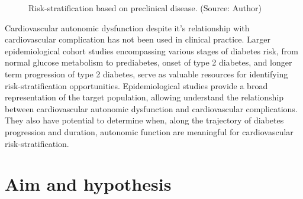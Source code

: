\documentclass[
  a4paper,
  headsepline=true,
  open=any]{scrbook}
\begin{document}
\begin{figure}

\begin{minipage}[t]{\linewidth}

{\centering 


\caption{Risk-stratification based on preclinical disease. (Source:
Author)}

}

\end{minipage}%

\end{figure}

Cardiovascular autonomic dysfunction despite it's relationship with
cardiovascular complication has not been used in clinical practice.
Larger epidemiological cohort studies encompassing various stages of
diabetes risk, from normal glucose metabolism to prediabetes, onset of
type 2 diabetes, and longer term progression of type 2 diabetes, serve
as valuable resources for identifying risk-stratification opportunities.
Epidemiological studies provide a broad representation of the target
population, allowing understand the relationship between cardiovascular
autonomic dysfunction and cardiovascular complications. They also have
potential to determine when, along the trajectory of diabetes
progression and duration, autonomic function are meaningful for
cardiovascular risk-stratification.


\hypertarget{aim-and-hypothesis}{%
\chapter{Aim and hypothesis}\label{aim-and-hypothesis}}
\end{document}
